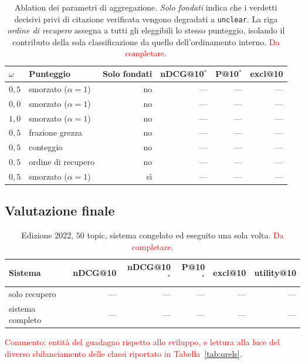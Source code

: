 \documentclass[pdflatex,sn-mathphys-num]{sn-jnl}
\theoremstyle{thmstyleone}
\theoremstyle{thmstyletwo}
\theoremstyle{thmstylethree}
\newcommand{\ev}[1]{\textcolor{red}{#1}}
\begin{document}
\begin{table}[H]
\centering
\begin{tabular}{llrrrr}
\toprule
$\omega$ & Punteggio & Solo fondati & nDCG@10$^{*}$ & P@10$^{*}$ & excl@10 \\
\midrule
$0{,}5$ & smorzato ($\alpha=1$) & no  & --- & --- & --- \\
$0{,}0$ & smorzato ($\alpha=1$) & no  & --- & --- & --- \\
$1{,}0$ & smorzato ($\alpha=1$) & no  & --- & --- & --- \\
$0{,}5$ & frazione grezza       & no  & --- & --- & --- \\
$0{,}5$ & conteggio             & no  & --- & --- & --- \\
$0{,}5$ & ordine di recupero    & no  & --- & --- & --- \\
$0{,}5$ & smorzato ($\alpha=1$) & sì  & --- & --- & --- \\
\bottomrule
\end{tabular}
\caption{Ablation dei parametri di aggregazione. \emph{Solo fondati} indica che i verdetti decisivi privi di citazione verificata vengono degradati a \texttt{unclear}. La riga \emph{ordine di recupero} assegna a tutti gli eleggibili lo stesso punteggio, isolando il contributo della sola classificazione da quello dell'ordinamento interno. \ev{Da completare.}}
\label{tab:aggregazione}
\end{table}

\subsection{Valutazione finale}\label{sec:res-test}

\begin{table}[H]
\centering
\begin{tabular}{lrrrrr}
\toprule
Sistema & nDCG@10 & nDCG@10$^{*}$ & P@10$^{*}$ & excl@10 & utility@10 \\
\midrule
solo recupero & --- & --- & --- & --- & --- \\
sistema completo & --- & --- & --- & --- & --- \\
\bottomrule
\end{tabular}
\caption{Edizione 2022, $50$ topic, sistema congelato ed eseguito una sola volta. \ev{Da completare.}}
\label{tab:test2022}
\end{table}

\ev{Commento: entità del guadagno rispetto allo sviluppo, e lettura alla luce del diverso sbilanciamento delle classi riportato in Tabella~\ref{tab:qrels}.}
\end{document}
